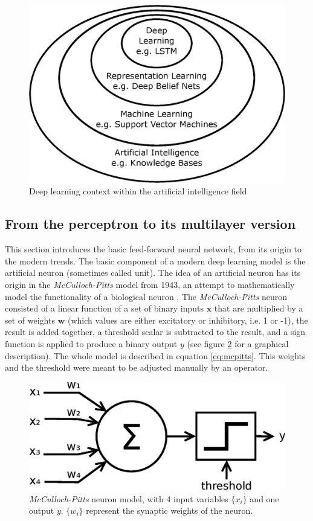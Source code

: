 \begin{figure}
	\centering
	\includegraphics[width=0.5\linewidth]{background/images/venn_DL}
	\caption[Deep learning \textit{Venn} diagram]{Deep learning context within the artificial intelligence field \autocite{Goodfellow2016}}
	\label{fig:venndl}
\end{figure}



\subsection{From the perceptron to its multilayer version} \label{sec:mlp}

This section introduces the basic feed-forward neural network, from its origin to the modern trends. The basic component of a modern deep learning model is the artificial neuron (sometimes called unit). The idea of an artificial neuron has its origin in the \textit{McCulloch-Pitts} model from 1943, an attempt to mathematically model the functionality of a biological neuron \autocite{mccullochPitts1943}. The \textit{McCulloch-Pitts} neuron consisted of a linear function of a set of binary inputs $\mathbf{x}$ that are multiplied by a set of weights $\mathbf{w}$ (which values are either excitatory or inhibitory, i.e. 1 or -1), the result is added together, a threshold scalar is subtracted to the result, and a sign function is applied to produce a binary output $y$ (see figure \ref{fig:mcpittsneuron} for a graphical description). The whole model is described in equation \ref{eq:mcpitts}. This weights and the threshold were meant to be adjusted manually by an operator.

\begin{figure}
	\centering
	\includegraphics[width=0.60\linewidth]{background/images/mcpittsneuron}
	\caption[\textit{McCulloch-Pitts} neuron model]{\textit{McCulloch-Pitts} neuron model, with 4 input variables $\{x_i\}$ and one output $y$. $\{w_i\}$ represent the synaptic weights of the neuron.}
	\label{fig:mcpittsneuron}
\end{figure}


